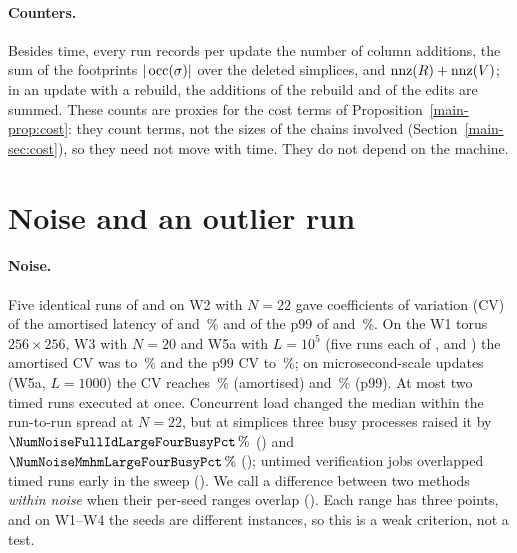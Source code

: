 \paragraph{Counters.}
Besides time, every run records per update the number of column additions, the
sum of the footprints $|\operatorname{occ}(\sigma)|$ over the deleted simplices, and
$\operatorname{nnz}(R)+\operatorname{nnz}(V)$; in an update with a rebuild, the additions of the rebuild and
of the edits are summed. These counts are proxies for the cost terms of
Proposition~\ref{main-prop:cost}: they count terms, not the sizes of the chains involved
(Section~\ref{main-sec:cost}), so they need not move with time. They do not depend on the
machine.


\section{Noise and an outlier run}\label{sec:s-noise}

\paragraph{Noise.}
Five identical runs of  and  on W2 with $N=22$ gave
coefficients of variation (CV) of the amortised latency of
\NumNoiseCVMmhmAmort{} and \NumNoiseCVFullIdAmort\,\% and of the p99 of
\NumNoiseCVWTwoNTwentyTwoSEightMmhmPNinetyNine{} and
\NumNoiseCVWTwoNTwentyTwoSEightFullIdPNinetyNine\,\%. On the W1 torus
$256\times256$, W3 with $N=20$ and W5a with $L=10^5$ (five runs each of
,  and ) the amortised CV was
\NumNoiseCVWOneTorusTwoHundredFiftySixDrbIdAmort{} to
\NumNoiseCVWThreeNTwentyMmhmAmort\,\% and the p99 CV
\NumNoiseCVWOneTorusTwoHundredFiftySixMmhmPNinetyNine{} to
\NumNoiseCVWFiveCycleLOneHundredThousandFullIdPNinetyNine\,\%; on
microsecond-scale updates (W5a, $L=1000$) the CV reaches
\NumNoiseCVAmortMax\,\% (amortised) and \NumNoiseCVPNinetyNineMax\,\% (p99). At
most two timed runs executed at once. Concurrent load changed the median within
the run-to-run spread at $N=22$, but at \NumWTwoNThirtyThreeSEightSize{} simplices
three busy processes raised it by $\NumNoiseFullIdLargeFourBusyPct\,\%$
() and $\NumNoiseMmhmLargeFourBusyPct\,\%$ ();
untimed verification jobs overlapped \NumTimedRunsWithUntimed{} timed runs early
in the sweep (). We call a difference between
two methods \emph{within noise} when their per-seed ranges overlap
(). Each range has three points, and
on W1--W4 the seeds are different instances, so this is a weak criterion, not a
test.


